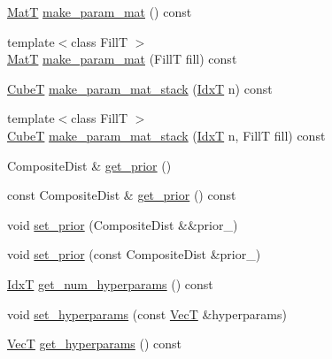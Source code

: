 \begin{DoxyCompactItemize}
\item 
\hyperlink{namespacemappel_a7091ab87c528041f7e2027195fad8915}{MatT} \hyperlink{classmappel_1_1PointEmitterModel_a8ede9fe8e3b6a3e621c2da72e23c7f9d}{make\+\_\+param\+\_\+mat} () const 
\item 
{\footnotesize template$<$class FillT $>$ }\\\hyperlink{namespacemappel_a7091ab87c528041f7e2027195fad8915}{MatT} \hyperlink{classmappel_1_1PointEmitterModel_a68a9c537f2f2725eb8fb9d3e250dd84b}{make\+\_\+param\+\_\+mat} (FillT fill) const 
\item 
\hyperlink{namespacemappel_ab2afab4e6c8805e83946670d882768c2}{CubeT} \hyperlink{classmappel_1_1PointEmitterModel_a57b98d5f8b2b5ed2c455bbf76b632f87}{make\+\_\+param\+\_\+mat\+\_\+stack} (\hyperlink{namespacemappel_ab17ec0f30b61ece292439d7ece81d3a8}{IdxT} n) const 
\item 
{\footnotesize template$<$class FillT $>$ }\\\hyperlink{namespacemappel_ab2afab4e6c8805e83946670d882768c2}{CubeT} \hyperlink{classmappel_1_1PointEmitterModel_a2c11fa045187c7ea9ba382141b5d53c1}{make\+\_\+param\+\_\+mat\+\_\+stack} (\hyperlink{namespacemappel_ab17ec0f30b61ece292439d7ece81d3a8}{IdxT} n, FillT fill) const 
\item 
Composite\+Dist \& \hyperlink{classmappel_1_1PointEmitterModel_a2182c250c15d590b582e76594e5f06b9}{get\+\_\+prior} ()
\item 
const Composite\+Dist \& \hyperlink{classmappel_1_1PointEmitterModel_a239826b8e6b914c0cdaa293f1f5ddfd4}{get\+\_\+prior} () const 
\item 
void \hyperlink{classmappel_1_1PointEmitterModel_a8ee7d3d5b4c1ae4500f802170a958ed7}{set\+\_\+prior} (Composite\+Dist \&\&prior\+\_\+)
\item 
void \hyperlink{classmappel_1_1PointEmitterModel_acf37c5f28dc0c66197162b3408a6b815}{set\+\_\+prior} (const Composite\+Dist \&prior\+\_\+)
\item 
\hyperlink{namespacemappel_ab17ec0f30b61ece292439d7ece81d3a8}{IdxT} \hyperlink{classmappel_1_1PointEmitterModel_a442522cdaaa76be15b00a4f25110d7ec}{get\+\_\+num\+\_\+hyperparams} () const 
\item 
void \hyperlink{classmappel_1_1PointEmitterModel_ac603a33d83a32f5e4dd826399521a28b}{set\+\_\+hyperparams} (const \hyperlink{namespacemappel_a2225ad69f358daa3f4f99282a35b9a3a}{VecT} \&hyperparams)
\item 
\hyperlink{namespacemappel_a2225ad69f358daa3f4f99282a35b9a3a}{VecT} \hyperlink{classmappel_1_1PointEmitterModel_a4085ade54f4b039c647bc9bf7804e007}{get\+\_\+hyperparams} () const 

\end{DoxyCompactItemize}
